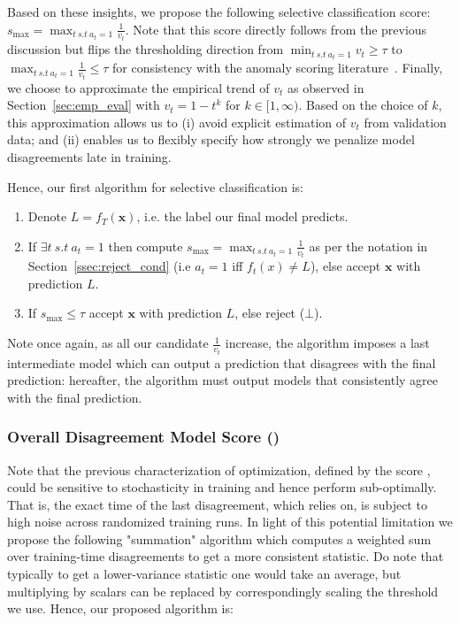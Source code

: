 Based on these insights, we propose the following selective classification score: $s_{\max} = \max_{t~s.t~a_t = 1} \frac{1}{v_t}$. Note that this score directly follows from the previous discussion but flips the thresholding direction from $\min_{t~s.t~a_t = 1}v_t \geq \tau$ to $\max_{t~s.t~a_t = 1} \frac{1}{v_t} \leq \tau$ for consistency with the anomaly scoring literature~\citep{ruff2018deep}. Finally, we choose to approximate the empirical trend of $v_t$ as observed in Section~\ref{sec:emp_eval} with $v_t = 1 - t^k$ for $k \in [1,\infty)$. Based on the choice of $k$, this approximation allows us to (i) avoid explicit estimation of $v_t$ from validation data; and (ii) enables us to flexibly specify how strongly we penalize model disagreements late in training.

Hence, our first algorithm for selective classification is:
\begin{enumerate}
    \item Denote $L = f_T(\bm{x})$, i.e. the label our final model predicts.
    \item If $\exists t~s.t~a_t =1$ then compute $s_\text{max} = \max_{t~s.t~a_t = 1} \frac{1}{v_t}$ as per the notation in Section~\ref{ssec:reject_cond} (i.e $a_t = 1$ iff $f_t(x) \neq L$), else accept $\bm{x}$ with prediction $L$.
    \item If $s_\text{max} \leq \tau$ accept $\bm{x}$ with prediction $L$, else reject ($\bot$).
\end{enumerate}
Note once again, as all our candidate $\frac{1}{v_t}$ increase, the algorithm imposes a last intermediate model which can output a prediction that disagrees with the final prediction: hereafter, the algorithm must output models that consistently agree with the final prediction.

\subsubsection{Overall Disagreement Model Score (\ssum)}
\label{ssec:avg_score}

Note that the previous characterization of optimization, defined by the score \smax, could be sensitive to stochasticity in training and hence perform sub-optimally. That is, the exact time of the last disagreement, which \smax relies on, is subject to high noise across randomized training runs. In light of this potential limitation we propose the following "summation" algorithm which computes a weighted sum over training-time disagreements to get a more consistent statistic. Do note that typically to get a lower-variance statistic one would take an average, but multiplying by scalars can be replaced by correspondingly scaling the threshold we use. Hence, our proposed algorithm is:

